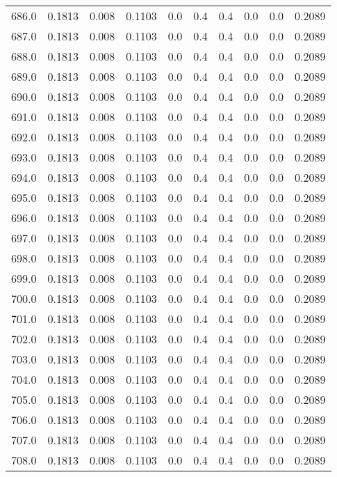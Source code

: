 \begin{longtable}{lrrrrrrrrr}
686.0 & 0.1813 & 0.008 & 0.1103 & 0.0 & 0.4 & 0.4 & 0.0 & 0.0 & 0.2089 \\
687.0 & 0.1813 & 0.008 & 0.1103 & 0.0 & 0.4 & 0.4 & 0.0 & 0.0 & 0.2089 \\
688.0 & 0.1813 & 0.008 & 0.1103 & 0.0 & 0.4 & 0.4 & 0.0 & 0.0 & 0.2089 \\
689.0 & 0.1813 & 0.008 & 0.1103 & 0.0 & 0.4 & 0.4 & 0.0 & 0.0 & 0.2089 \\
690.0 & 0.1813 & 0.008 & 0.1103 & 0.0 & 0.4 & 0.4 & 0.0 & 0.0 & 0.2089 \\
691.0 & 0.1813 & 0.008 & 0.1103 & 0.0 & 0.4 & 0.4 & 0.0 & 0.0 & 0.2089 \\
692.0 & 0.1813 & 0.008 & 0.1103 & 0.0 & 0.4 & 0.4 & 0.0 & 0.0 & 0.2089 \\
693.0 & 0.1813 & 0.008 & 0.1103 & 0.0 & 0.4 & 0.4 & 0.0 & 0.0 & 0.2089 \\
694.0 & 0.1813 & 0.008 & 0.1103 & 0.0 & 0.4 & 0.4 & 0.0 & 0.0 & 0.2089 \\
695.0 & 0.1813 & 0.008 & 0.1103 & 0.0 & 0.4 & 0.4 & 0.0 & 0.0 & 0.2089 \\
696.0 & 0.1813 & 0.008 & 0.1103 & 0.0 & 0.4 & 0.4 & 0.0 & 0.0 & 0.2089 \\
697.0 & 0.1813 & 0.008 & 0.1103 & 0.0 & 0.4 & 0.4 & 0.0 & 0.0 & 0.2089 \\
698.0 & 0.1813 & 0.008 & 0.1103 & 0.0 & 0.4 & 0.4 & 0.0 & 0.0 & 0.2089 \\
699.0 & 0.1813 & 0.008 & 0.1103 & 0.0 & 0.4 & 0.4 & 0.0 & 0.0 & 0.2089 \\
700.0 & 0.1813 & 0.008 & 0.1103 & 0.0 & 0.4 & 0.4 & 0.0 & 0.0 & 0.2089 \\
701.0 & 0.1813 & 0.008 & 0.1103 & 0.0 & 0.4 & 0.4 & 0.0 & 0.0 & 0.2089 \\
702.0 & 0.1813 & 0.008 & 0.1103 & 0.0 & 0.4 & 0.4 & 0.0 & 0.0 & 0.2089 \\
703.0 & 0.1813 & 0.008 & 0.1103 & 0.0 & 0.4 & 0.4 & 0.0 & 0.0 & 0.2089 \\
704.0 & 0.1813 & 0.008 & 0.1103 & 0.0 & 0.4 & 0.4 & 0.0 & 0.0 & 0.2089 \\
705.0 & 0.1813 & 0.008 & 0.1103 & 0.0 & 0.4 & 0.4 & 0.0 & 0.0 & 0.2089 \\
706.0 & 0.1813 & 0.008 & 0.1103 & 0.0 & 0.4 & 0.4 & 0.0 & 0.0 & 0.2089 \\
707.0 & 0.1813 & 0.008 & 0.1103 & 0.0 & 0.4 & 0.4 & 0.0 & 0.0 & 0.2089 \\
708.0 & 0.1813 & 0.008 & 0.1103 & 0.0 & 0.4 & 0.4 & 0.0 & 0.0 & 0.2089 \\

\end{longtable}
